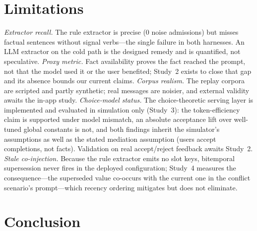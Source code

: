 \documentclass[letterpaper]{article}
\begin{document}
\section{Limitations}

\emph{Extractor recall.} The rule extractor is precise (0 noise
admissions) but misses factual sentences without signal verbs---the single
failure in both harnesses. An LLM extractor on the cold path is the
designed remedy and is quantified, not speculative.
\emph{Proxy metric.} Fact availability proves the fact reached the
prompt, not that the model used it or the user benefited; Study~2 exists
to close that gap and its absence bounds our current claims.
\emph{Corpus realism.} The replay corpora are scripted and partly
synthetic; real messages are noisier, and external validity awaits the
in-app study.
\emph{Choice-model status.} The choice-theoretic serving layer is
implemented and evaluated in simulation only (Study~3): the
token-efficiency claim is supported under model mismatch, an absolute
acceptance lift over well-tuned global constants is not, and both
findings inherit the simulator's assumptions as well as the stated
mediation assumption (users accept completions, not facts). Validation
on real accept/reject feedback awaits Study~2.
\emph{Stale co-injection.} Because the rule extractor emits no slot
keys, bitemporal supersession never fires in the deployed configuration;
Study~4 measures the consequence---the superseded value co-occurs with
the current one in the conflict scenario's prompt---which recency
ordering mitigates but does not eliminate.

\section{Conclusion}
\end{document}
